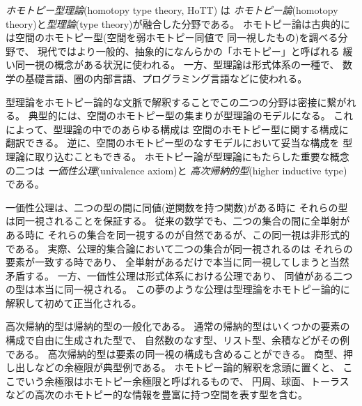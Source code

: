 \documentclass[index]{subfiles}
\begin{document}

\emph{ホモトピー型理論}(homotopy type theory, HoTT) は
\emph{ホモトピー論}(homotopy theory)と\emph{型理論}(type theory)が融合した分野である。
ホモトピー論は古典的には空間のホモトピー型(空間を弱ホモトピー同値で
同一視したもの)を調べる分野で、
現代ではより一般的、抽象的になんらかの「ホモトピー」と呼ばれる
緩い同一視の概念がある状況に使われる。
一方、型理論は形式体系の一種で、
数学の基礎言語、圏の内部言語、プログラミング言語などに使われる。

型理論をホモトピー論的な文脈で解釈することでこの二つの分野は密接に繋がれる。
典型的には、空間のホモトピー型の集まりが型理論のモデルになる。
これによって、型理論の中でのあらゆる構成は
空間のホモトピー型に関する構成に翻訳できる。
逆に、空間のホモトピー型のなすモデルにおいて妥当な構成を
型理論に取り込むこともできる。
ホモトピー論が型理論にもたらした重要な概念の二つは
\emph{一価性公理}(univalence axiom)と
\emph{高次帰納的型}(higher inductive type)である。

一価性公理は、二つの型の間に同値(逆関数を持つ関数)がある時に
それらの型は同一視されることを保証する。
従来の数学でも、二つの集合の間に全単射がある時に
それらの集合を同一視するのが自然であるが、この同一視は非形式的である。
実際、公理的集合論において二つの集合が同一視されるのは
それらの要素が一致する時であり、
全単射があるだけで本当に同一視してしまうと当然矛盾する。
一方、一価性公理は形式体系における公理であり、
同値がある二つの型は本当に同一視される。
この夢のような公理は型理論をホモトピー論的に解釈して初めて正当化される。

高次帰納的型は帰納的型の一般化である。
通常の帰納的型はいくつかの要素の構成で自由に生成された型で、
自然数のなす型、リスト型、余積などがその例である。
高次帰納的型は要素の同一視の構成も含めることができる。
商型、押し出しなどの余極限が典型例である。
ホモトピー論的解釈を念頭に置くと、
ここでいう余極限はホモトピー余極限と呼ばれるもので、
円周、球面、トーラスなどの高次のホモトピー的な情報を豊富に持つ空間を表す型を含む。

\begin{mySubsections}
  
\end{mySubsections}
\end{document}
